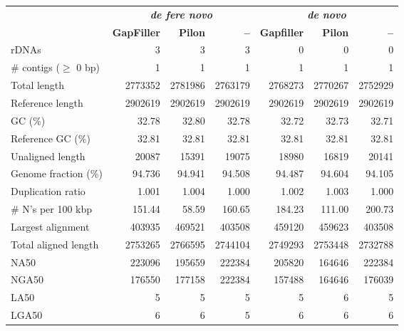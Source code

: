 \documentclass[10pt]{article}
\begin{document}
\begin{table}[ht]
\begin{center}
\begin{tabular}{lrrr|rrr}
   & \multicolumn{3}{c}{\textbf{\textit{de fere novo}}} & \multicolumn{3}{c}{\textbf{\textit{de novo}}} \\
   & \textbf{GapFiller} & \textbf{Pilon} & \textbf{--} & \textbf{Gapfiller} &  \textbf{Pilon} & \textbf{--} \\
  rDNAs & \cellcolor[HTML]{CDCDF9}3 & \cellcolor[HTML]{CDCDF9}3 &\cellcolor[HTML]{CDCDF9} 3 & 0 & 0 & 0\\
  \# contigs ($\geq$ 0 bp) & 1 & 1 & 1 & 1 & 1 & 1 \\
  Total length & 2773352 & \cellcolor[HTML]{CDCDF9}2781986 & 2763179 & 2768273 & 2770267 & \cellcolor[HTML]{FBDADA}2752929 \\
  Reference length & 2902619 & 2902619 & 2902619 & 2902619 & 2902619 & 2902619 \\
  GC (\%) & 32.78 & 32.80 & 32.78 & 32.72 & 32.73 & 32.71 \\
  Reference GC (\%) & 32.81 & 32.81 & 32.81 & 32.81 & 32.81 & 32.81 \\
  Unaligned length & 20087 & \cellcolor[HTML]{CDCDF9}15391 & 19075 & 18980 & 16819 & \cellcolor[HTML]{FBDADA}20141 \\
  Genome fraction (\%) & 94.736 & \cellcolor[HTML]{CDCDF9}94.941 & 94.508 & 94.487 & 94.604 & \cellcolor[HTML]{FBDADA}94.105 \\
  Duplication ratio & 1.001 & 1.004 & \cellcolor[HTML]{CDCDF9}1.000 & 1.002 & 1.003 & \cellcolor[HTML]{CDCDF9}1.000 \\
  \# N's per 100 kbp & 151.44 & \cellcolor[HTML]{CDCDF9}58.59 & 160.65 & 184.23 & 111.00 & \cellcolor[HTML]{FBDADA}200.73 \\
  Largest alignment & 403935 & \cellcolor[HTML]{CDCDF9}469521 & \cellcolor[HTML]{FBDADA}403508 & 459120 & 459623 & \cellcolor[HTML]{FBDADA}403508 \\
  Total aligned length & 2753265 & \cellcolor[HTML]{CDCDF9}2766595 & 2744104 & 2749293 & 2753448 & \cellcolor[HTML]{FBDADA}2732788 \\
  NA50 & \cellcolor[HTML]{CDCDF9}223096 & 195659 & 222384 & 205820 & \cellcolor[HTML]{FBDADA}164646 & 222384 \\
  NGA50 & 176550 & 177158 & \cellcolor[HTML]{CDCDF9}222384 &\cellcolor[HTML]{FBDADA} 157488 & 164646 & 176039 \\
  LA50 & 5 & \cellcolor[HTML]{CDCDF9}5 & \cellcolor[HTML]{CDCDF9}5 & \cellcolor[HTML]{CDCDF9}5 & \cellcolor[HTML]{FBDADA}6 & \cellcolor[HTML]{CDCDF9}5 \\
  LGA50 & 6 & 6 & \cellcolor[HTML]{CDCDF9}5 & 6 & 6 & 6 \\
\end{tabular}
\end{center}
\end{table}


\pagebreak


\end{document}
